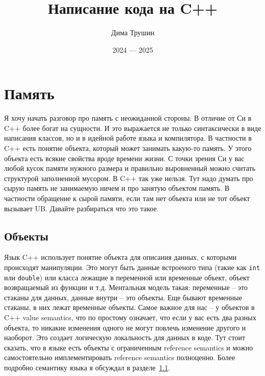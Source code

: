 \documentclass{article}
\title{Написание кода на C++}
\author{Дима Трушин}
\date{2024 --- 2025}
\begin{document}
\maketitle
\tableofcontents

\newpage

\section{Память}

Я хочу начать разговор про память с неожиданной стороны.
В отличие от Си в C++ более богат на сущности.
И это выражается не только синтаксически в виде написания классов, но и в идейной работе языка и компилятора.
В частности в C++ есть понятие объекта, который может занимать какую-то память.
У этого объекта есть всякие свойства вроде времени жизни.
С точки зрения Си у вас любой кусок памяти нужного размера и правильно выровненный можно считать структурой заполненной мусором.
В C++ так уже нельзя.
Тут надо думать про сырую память не занимаемую ничем и про занятую объектом память.
В частности обращение к сырой памяти, если там нет объекта или не тот объект вызывает UB.
Давайте разбираться что это такое.

\subsection{Объекты}

Язык C++ использует понятие объекта для описания данных, с которыми происходят манипуляции.
Это могут быть данные встроеного типа (такие как \verb"int" или \verb"double") или класса лежащие в переменной или временные объект, объект возвращаемый из функции и т.д.
Ментальная модель такая: переменные -- это стаканы для данных, данные внутри -- это объекты.
Еще бывают временные стаканы, в них лежат временные объекты.
Самое важное для нас -- у объектов в C++ value semantics, что по простому означает, что если у вас есть два разных объекта, то никакие изменения одного не могут повлечь изменение другого и наоборот.
Это создает логическую локальность для данных в коде.
Тут стоит сказать, что в языке есть объекты с ограниченным reference semantics и можно самостоятельно имплементировать reference semantics полноценно.
Более подробно семантику языка я обсуждал в разделе~\ref{}.
\end{document}
